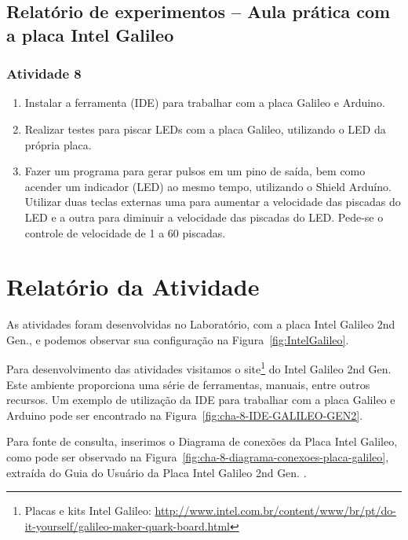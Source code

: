 \documentclass[
	12pt,				%
	openright,			%
  oneside,     %
	a4paper,			%
	english,			%
	french,				%
	spanish,			%
	brazil				%
	]{abntex2}
\begin{document}
\subsection*{Relatório de experimentos – Aula prática com a placa Intel Galileo}

\subsubsection*{Atividade 8}

\begin{enumerate}
  \item Instalar a ferramenta (IDE) para trabalhar com a placa Galileo e Arduino.
  \item Realizar testes para piscar LEDs com a placa Galileo, utilizando o LED da própria placa.
  \item Fazer um programa para gerar pulsos em um pino de saída, bem como acender um indicador (LED) ao mesmo tempo, utilizando o Shield Arduíno. Utilizar duas teclas externas uma para aumentar a velocidade das piscadas do LED e a outra para diminuir a velocidade das piscadas do LED. Pede-se o controle de velocidade de 1 a 60 piscadas.
\end{enumerate}

\section{Relatório da Atividade} %
\label{sec:consideracoes-Placa-Intel-Galileo}

As atividades foram desenvolvidas no Laboratório, com a placa Intel Galileo 2nd Gen., e podemos observar sua configuração na Figura~\ref{fig:IntelGalileo}.

Para desenvolvimento das atividades visitamos o site\footnote{Placas e kits Intel Galileo: \url{http://www.intel.com.br/content/www/br/pt/do-it-yourself/galileo-maker-quark-board.html}} do Intel Galileo 2nd Gen. Este ambiente proporciona uma série de ferramentas, manuais, entre outros recursos. Um exemplo de utilização da IDE para trabalhar com a placa Galileo e Arduino pode ser encontrado na Figura~\ref{fig:cha-8-IDE-GALILEO-GEN2}.

Para fonte de consulta, inserimos o Diagrama de conexões da Placa Intel Galileo, como pode ser observado na Figura~\ref{fig:cha-8-diagrama-conexoes-placa-galileo}, extraída do Guia do Usuário da Placa Intel Galileo 2nd Gen. \cite{Corporation2014}.
\end{document}

